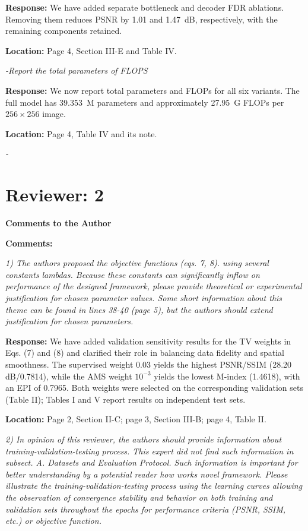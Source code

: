\documentclass[11pt,letterpaper]{article}
\begin{document}
\textbf{Response:} We have added separate bottleneck and decoder FDR ablations. Removing them reduces PSNR by 1.01 and 1.47~dB, respectively, with the remaining components retained.

\textbf{Location:} Page 4, Section III-E and Table IV.

\textit{-Report the total parameters of FLOPS}

\textbf{Response:} We now report total parameters and FLOPs for all six variants. The full model has 39.353~M parameters and approximately 27.95~G FLOPs per \(256\times256\) image.

\textbf{Location:} Page 4, Table IV and its note.

\textit{-}

\section*{Reviewer: 2}
\textbf{Comments to the Author}\par
\textbf{Comments:}

\textit{1) The authors proposed the objective functions (eqs. 7, 8). using several constants lambdas. Because these constants can significantly inflow on performance of the designed framework, please provide theoretical or experimental justification for chosen parameter values. Some short information about this theme can be found in lines 38-40 (page 5), but the authors should extend justification for chosen parameters.}

\medskip
\textbf{Response:} We have added validation sensitivity results for the TV weights in Eqs. (7) and (8) and clarified their role in balancing data fidelity and spatial smoothness. The supervised weight 0.03 yields the highest PSNR/SSIM (28.20 dB/0.7814), while the AMS weight \(10^{-3}\) yields the lowest M-index (1.4618), with an EPI of 0.7965. Both weights were selected on the corresponding validation sets (Table II); Tables I and V report results on independent test sets.

\textbf{Location:} Page 2, Section II-C; page 3, Section III-B; page 4, Table II.

\textit{2) In opinion of this reviewer, the authors should provide information about training-validation-testing process. This expert did not find such information in subsect. A. Datasets and Evaluation Protocol. Such information is important for better understanding by a potential reader how works novel framework. Please illustrate the training-validation-testing process using the learning curves allowing the observation of convergence stability and behavior on both training and validation sets throughout the epochs for performance criteria (PSNR, SSIM, etc.) or objective function.}
\end{document}
